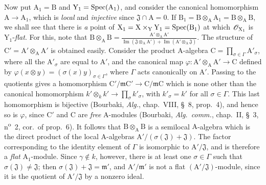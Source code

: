 \begin{env}[11.7.1]
Now put $\mathrm{A}_1=\mathrm{B}$ and $\mathrm{Y}_1=\operatorname{Spec}(\mathrm{A}_1)$, and consider the canonical homomorphism $\mathrm{A}\to\mathrm{A}_1$, which is \emph{local} and \emph{injective} since $\mathfrak{J}\cap\mathrm{A}=0$. If $\mathrm{B}_1=\mathrm{B}\otimes_\mathrm{A}\mathrm{A}_1=\mathrm{B}\otimes_\mathrm{A}\mathrm{B}$, we shall see that there is \emph{a} point of $\mathrm{X}_1=\mathrm{X}\times_\mathrm{Y}\mathrm{Y}_1=\operatorname{Spec}(\mathrm{B}_1)$ at which $\mathscr{O}_{\mathrm{X}_1}$ is $\mathrm{Y}_1$-\emph{flat}.
For this, note that $\mathrm{B}\otimes_\mathrm{A}\mathrm{B}
=\frac{\mathrm{A}'\otimes_\mathrm{A}\mathrm{A}'}
{\operatorname{Im}(\mathfrak{J}\otimes_\mathrm{A}\mathrm{A}')+\operatorname{Im}(\mathrm{A}'\otimes_\mathrm{A}\mathfrak{J})}$.
The structure of $\mathrm{C}'=\mathrm{A}'\otimes_\mathrm{A}\mathrm{A}'$ is obtained easily. Consider the product $\mathrm{A}$-algebra $\mathrm{C}=\prod_{\sigma\in\Gamma}\mathrm{A}'_\sigma$, where all the $\mathrm{A}'_\sigma$ are equal to $\mathrm{A}'$, and the canonical map $\varphi:\mathrm{A}'\otimes_\mathrm{A}\mathrm{A}'\to\mathrm{C}$ defined by $\varphi(x\otimes y)=(\sigma(x)y)_{\sigma\in\Gamma}$, where $\Gamma$ acts canonically on $\mathrm{A}'$. Passing to the quotients gives a homomorphism $\mathrm{C}'/\mathfrak{m}\mathrm{C}'\to\mathrm{C}/\mathfrak{m}\mathrm{C}$ which is none other than the canonical homomorphism $k'\otimes_k k'\to\prod_\sigma k'_\sigma$, with $k'_\sigma=k'$ for all $\sigma\in\Gamma$. This last homomorphism is bijective (Bourbaki, \emph{Alg.}, chap.~VIII, \S~8, prop.~4), and hence so is $\varphi$, since $\mathrm{C}'$ and $\mathrm{C}$ are \emph{free} $\mathrm{A}$-modules (Bourbaki, \emph{Alg.\ comm.}, chap.~II, \S~3, n\textsuperscript{o}~2, cor.~of prop.~6).
It follows that $\mathrm{B}\otimes_\mathrm{A}\mathrm{B}$ is a semilocal $\mathrm{A}$-algebra which is the direct product of the local $\mathrm{A}$-algebras $\mathrm{A}'/(\sigma(\mathfrak{J})+\mathfrak{J})$. The factor corresponding to the identity element of $\Gamma$ is isomorphic to $\mathrm{A}'/\mathfrak{J}$, and is therefore a \emph{flat} $\mathrm{A}_1$-module. Since $\gamma\notin k$, however, there is at least one $\sigma\in\Gamma$ such that $\sigma(\mathfrak{J})\ne\mathfrak{J}$; then $\sigma(\mathfrak{J})+\mathfrak{J}=\mathfrak{m}'$, and $\mathrm{A}'/\mathfrak{m}'$ is not a flat $(\mathrm{A}'/\mathfrak{J})$-module, since it is the quotient of $\mathrm{A}'/\mathfrak{J}$ by a nonzero ideal.
\end{env}

